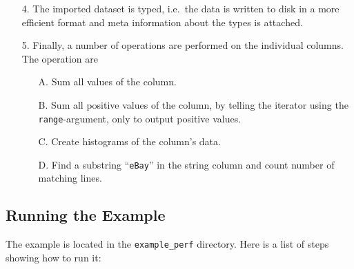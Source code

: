 \documentclass[a4paper]{article}
\begin{document}
\begin{enumerate}
  \item[4.] The imported dataset is typed, i.e.\ the data is written
    to disk in a more efficient format and meta information about the
    types is attached.

  \item[5.]  Finally, a number of operations are performed on the
    individual columns.  The operation are
    \begin{itemize}
    \item[A.] Sum all values of the column.
    \item[B.] Sum all positive values of the column, by telling the
      iterator using the \texttt{range}-argument, only to output
      positive values.
    \item[C.] Create histograms of the column's data.
    \item[D.] Find a substring ``\texttt{eBay}'' in the string column
      and count number of matching lines.

    \end{itemize}

\end{enumerate}


\subsection*{Running the Example}
The example is located in the \texttt{example\_perf} directory.  Here
is a list of steps showing how to run it:
\end{document}
